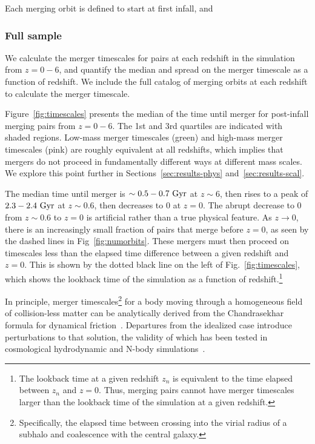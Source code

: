 \documentclass[twocolumn,linenumbers]{aastex631}
\begin{document}
    Each merging orbit is defined to start at first infall, and 
    


    \subsubsection{Full sample}
        We calculate the merger timescales for pairs at each redshift in the simulation from $z=0-6$, and quantify the median and spread on the merger timescale as a function of redshift. 
        We include the full catalog of merging orbits at each redshift to calculate the merger timescale. 
        
        Figure~\ref{fig:timescales} presents the median of the time until merger for post-infall merging pairs from $z=0-6$. 
        The 1st and 3rd quartiles are indicated with shaded regions. 
        Low-mass merger timescales (green) and high-mass merger timescales (pink) are roughly equivalent at all redshifts, which implies that mergers do not proceed in fundamentally different ways at different mass scales. 
        We explore this point further in Sections~\ref{sec:results-phys} and~\ref{sec:results-scal}.
        
        The median time until merger is $\sim0.5-0.7\,\mathrm{\,Gyr}$ at $z\sim6$, then rises to a peak of $2.3-2.4\,\mathrm{\,Gyr}$ at $z\sim0.6$, then decreases to 0 at $z=0$.
        The abrupt decrease to 0 from $z\sim0.6$ to $z=0$ is artificial rather than a true physical feature. 
        As $z\to0$, there is an increasingly small fraction of pairs that merge before $z=0$, as seen by the dashed lines in Fig~\ref{fig:numorbits}. 
        These mergers must then proceed on timescales less than the elapsed time difference between a given redshift and $z=0$. 
        This is shown by the dotted black line on the left of Fig.~\ref{fig:timescales}, which shows the lookback time of the simulation as a function of redshift.\footnote{The lookback time at a given redshift $z_n$ is equivalent to the time elapsed between $z_n$ and $z=0$. Thus, merging pairs cannot have merger timescales larger than the lookback time of the simulation at a given redshift.} %

        In principle, merger timescales\footnote{Specifically, the elapsed time between crossing into the virial radius of a subhalo and coalescence with the central galaxy.} for a body moving through a homogeneous field of collision-less matter can be analytically derived from the Chandrasekhar formula for dynamical friction~\citep{Binney2008}. 
        Departures from the idealized case introduce perturbations to that solution, the validity of which has been tested in cosmological hydrodynamic and N-body simulations~\citep{Jiang2008, Boylan_kolchin2008}. 
\end{document}
